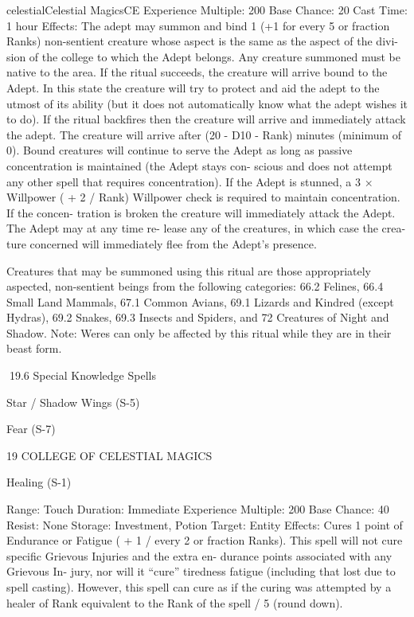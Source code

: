 \begin{College}[1.3]{celestial}{Celestial Magics}{CE}
Experience Multiple: 200 
Base Chance: 20%
Cast Time: 1 hour 
Effects: The adept may summon and bind 1 (+1 for 
every  5  or  fraction  Ranks)  non-sentient  creature 
whose aspect is the same as the aspect of the divi-
sion  of  the  college  to  which  the  Adept  belongs. 
Any creature summoned must be native to the area. 
If the ritual succeeds, the creature will arrive bound 
to  the  Adept.  In  this  state  the  creature  will  try  to 
protect and aid the adept to the utmost of its ability 
(but it does not automatically know what the adept 
wishes  it  to  do).  If  the  ritual  backfires  then  the 
creature  will  arrive  and  immediately  attack  the 
adept.  The  creature  will  arrive  after  (20  -  D10  - 
Rank)  minutes  (minimum  of  0).  Bound  creatures 
will continue to serve the Adept as long as passive 
concentration  is  maintained  (the  Adept  stays  con-
scious  and  does  not  attempt  any  other  spell  that 
requires concentration). If the Adept is stunned, a 3 
×  Willpower  (  +  2  /  Rank)  Willpower  check  is 
required  to  maintain  concentration.  If  the  concen-
tration  is  broken  the  creature  will  immediately 
attack  the  Adept.  The  Adept  may  at  any  time  re-
lease  any  of  the  creatures,  in  which case  the  crea-
ture  concerned  will  immediately  flee  from  the 
Adept’s presence.  

Creatures  that  may  be  summoned  using  this  ritual 
are 
those  appropriately  aspected,  non-sentient 
beings from the following categories: 66.2 Felines, 
66.4 Small Land Mammals, 67.1 Common Avians, 
69.1  Lizards  and  Kindred  (except  Hydras),  69.2 
Snakes, 69.3 Insects and Spiders, and 72 Creatures 
of  Night  and  Shadow.  Note:  Weres  can  only  be 
affected  by  this  ritual  while  they  are  in their  beast 
form. 

19.6 Special Knowledge Spells 

Star / Shadow Wings (S-5) 

Fear (S-7) 

19 COLLEGE OF CELESTIAL MAGICS 

Healing (S-1) 

Range: Touch 
Duration: Immediate 
Experience Multiple: 200 
Base Chance: 40%
Resist: None 
Storage: Investment, Potion 
Target: Entity 
Effects: Cures 1 point of Endurance or Fatigue ( + 
1  /  every  2  or  fraction  Ranks).  This  spell  will  not 
cure  specific  Grievous  Injuries  and  the  extra  en-
durance  points  associated  with  any  Grievous  In-
jury, nor will it “cure” tiredness fatigue (including 
that  lost  due  to  spell  casting).  However,  this  spell 
can cure as if the curing was attempted by a healer 
of  Rank  equivalent  to  the  Rank  of  the  spell  /  5 
(round down). 


\end{College}
